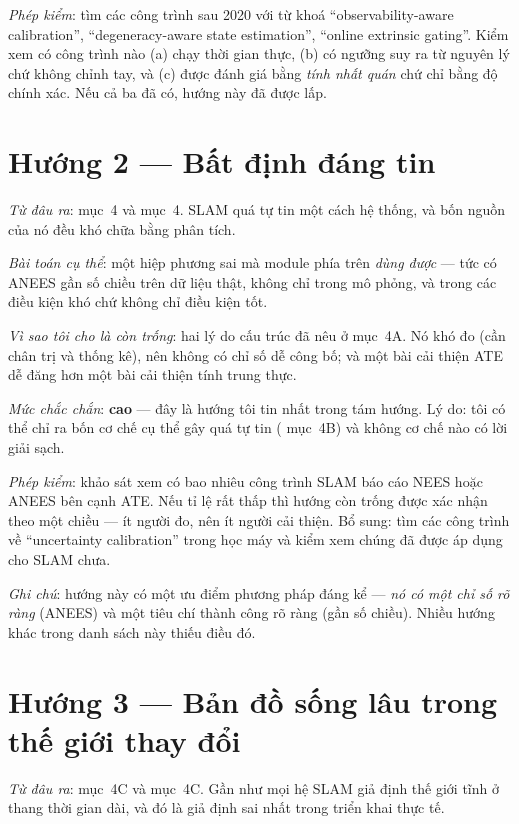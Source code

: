 \documentclass[../../vslam.tex]{subfiles}
\begin{document}
\emph{Phép kiểm}: tìm các công trình sau 2020 với từ khoá ``observability-aware calibration'', ``degeneracy-aware state estimation'', ``online extrinsic gating''. Kiểm xem có công trình nào (a) chạy thời gian thực, (b) có ngưỡng suy ra từ nguyên lý chứ không chỉnh tay, và (c) được đánh giá bằng \emph{tính nhất quán} chứ chỉ bằng độ chính xác. Nếu cả ba đã có, hướng này đã được lấp.

\section{Hướng 2 --- Bất định đáng tin}

\emph{Từ đâu ra}:  mục~4 và  mục~4. SLAM quá tự tin một cách hệ thống, và bốn nguồn của nó đều khó chữa bằng phân tích.

\emph{Bài toán cụ thể}: một hiệp phương sai mà module phía trên \emph{dùng được} --- tức có ANEES gần số chiều trên dữ liệu thật, không chỉ trong mô phỏng, và trong các điều kiện khó chứ không chỉ điều kiện tốt.

\emph{Vì sao tôi cho là còn trống}: hai lý do cấu trúc đã nêu ở  mục~4A. Nó khó đo (cần chân trị và thống kê), nên không có chỉ số dễ công bố; và một bài cải thiện ATE dễ đăng hơn một bài cải thiện tính trung thực.

\emph{Mức chắc chắn}: \textbf{cao} --- đây là hướng tôi tin nhất trong tám hướng. Lý do: tôi có thể chỉ ra bốn cơ chế cụ thể gây quá tự tin ( mục~4B) và không cơ chế nào có lời giải sạch.

\emph{Phép kiểm}: khảo sát xem có bao nhiêu công trình SLAM báo cáo NEES hoặc ANEES bên cạnh ATE. Nếu tỉ lệ rất thấp thì hướng còn trống được xác nhận theo một chiều --- ít người đo, nên ít người cải thiện. Bổ sung: tìm các công trình về ``uncertainty calibration'' trong học máy và kiểm xem chúng đã được áp dụng cho SLAM chưa.

\emph{Ghi chú}: hướng này có một ưu điểm phương pháp đáng kể --- \emph{nó có một chỉ số rõ ràng} (ANEES) và một tiêu chí thành công rõ ràng (gần số chiều). Nhiều hướng khác trong danh sách này thiếu điều đó.

\section{Hướng 3 --- Bản đồ sống lâu trong thế giới thay đổi}

\emph{Từ đâu ra}:  mục~4C và  mục~4C. Gần như mọi hệ SLAM giả định thế giới tĩnh ở thang thời gian dài, và đó là giả định sai nhất trong triển khai thực tế.
\end{document}

